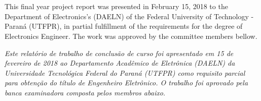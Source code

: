 % 
%
\begin{approvalsheet}

	\begin{center}
		\begin{center}
			\MakeUppercase{\printauthorone} \\
			\MakeUppercase{\printauthortwo} \\
		\end{center}

		\vspace*{\fill}\vspace*{\fill}
		\begin{center}
			\Large
			\MakeUppercase{
				\imprimirtitulo
			}
		\end{center}
		\vspace*{\fill}
	\end{center}

	\noindent
	This final year project report was presented in February 15, 2018 to the Department of
	Electronics's (DAELN) of the Federal University of Technology - Paraná (UTFPR), in
	partial fulfillment of the requirements for the degree of Electronics Engineer.
	The work was approved by the committee members bellow.
	\vspace*{\fill}

	\noindent
	\textit{
		Este relatório de trabalho de conclusão de curso foi apresentado em 15 de fevereiro
		de 2018 ao Departamento Acadêmico de Eletrônica (DAELN) da Universidade Tecnológica
		Federal do Paraná (UTFPR) como requisito parcial para obtenção do título de Engenheiro
		Eletrônico. O trabalho foi aprovado pela banca examinadora composta pelos membros abaixo.
	}

	\vspace*{\fill}
	\vspace*{\fill}

	\signature{\textbf{Prof. Dr. Gustavo Borba \\ (DAELN - UTFPR)} \\ Advisor}
	\signature{\textbf{Mikhail Anatholy Koslowski \\ (Engineer at Pumatronix - Curitiba)} \\ Co-advisor}
	\signature{\textbf{Prof. M.Sc. Leonardo Gomes Tavares \\ (Universidade Positivo - UP)}}
	\signature{\textbf{Prof. M.Sc. Ricardo Pedroni \\ (DAELN - UTFPR)}}

  \vspace*{\fill}
\end{approvalsheet}
